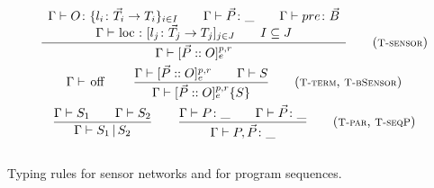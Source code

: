 \begin{myfigure}
  \begin{gather*}
   \frac{
     \begin{array}{c}
     \Gamma
     \type O \colon \objd
     \qquad
     \Gamma
     \type \vec P \colon \_
     \qquad
     \Gamma \type p r e \colon \vec B
     \\
     \Gamma \type \lock \colon \senObj {l_j \colon \vec T_j \rightarrow T_j}_{j \in J}
     \qquad
     I \subseteq J
   \end{array}
   }
   {
     \Gamma \type \sensord
   }
   \tag{\TSsensor}
   \\[\rulespace]
   \Gamma \type \inactionn
   \qquad
   \frac{
     \Gamma \type \sensord
     \qquad
     \Gamma \type S
   }
   {
     \Gamma \type \tagsensord 
   }
   \tag{\TSinaction, \TSbSensor}
   \\[\rulespace]
   \frac{
     \Gamma \type S_1 
     \qquad
     \Gamma \type S_2
   }
   {
     \Gamma \type S_1 \parn S_2
   }
   \qquad
   \frac{
     \Gamma \type P \colon \_
     \qquad
     \Gamma 
     \type \vec P \colon \_
   }
   {
     \Gamma \type P, \vec P \colon \_
   }
   \tag{\Tparallel, \TseqP}
 \end{gather*}
 \\[-0.4cm]
\caption{Typing rules for sensor networks and for program sequences.}
\label{fig:type-system-sensors}
\end{myfigure}

